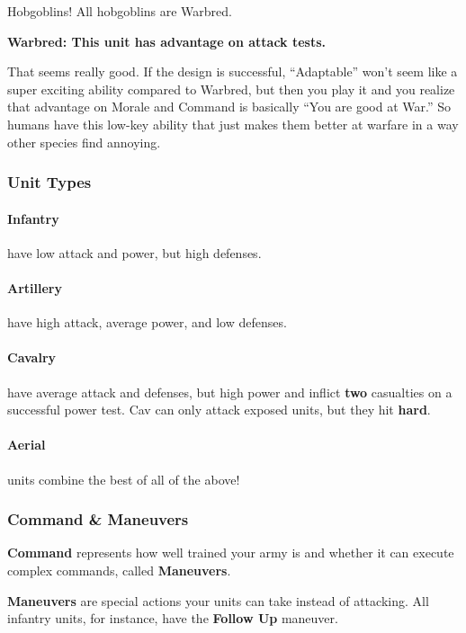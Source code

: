 \documentclass[letterpaper,twocolumn,openany,nodeprecatedcode]{dndbook}
\begin{document}
Hobgoblins! All hobgoblins are Warbred.

\textbf{Warbred: This unit has advantage on attack tests.}

\begin{DndReadAloud}
That seems really good. If the design is successful, “Adaptable” won’t seem like a super exciting ability compared to Warbred, but then you play it and you realize that advantage on Morale and Command is basically “You are good at War.” So humans have this low-key ability that just makes them better at warfare in a way other species find annoying.
\end{DndReadAloud}

\subsubsection{Unit Types}

\paragraph{Infantry} have low attack and power, but high defenses.

\paragraph{Artillery} have high attack, average power, and low defenses.

\paragraph{Cavalry} have average attack and defenses, but high power and inflict \textbf{two} casualties on a successful power test. Cav can only attack exposed units, but they hit \textbf{hard}.

\paragraph{Aerial} units combine the best of all of the above!

\subsubsection{Command \& Maneuvers}

\textbf{Command} represents how well trained your army is and whether it can execute complex commands, called \textbf{Maneuvers}.

\textbf{Maneuvers} are special actions your units can take instead of attacking. All infantry units, for instance, have the \textbf{Follow Up} maneuver.
\end{document}
